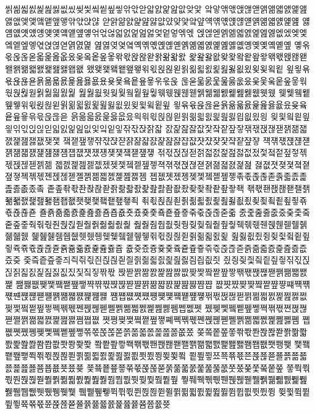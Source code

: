 씱씲씳씴씵씶씷씺씼씾씿앀앁앂앃앆앇앋앏앐앑앒앖앚앛
앜앟앢앣앥앦앧앩앪앫앬앭앮앯앲앶앷앸앹앺앻앾앿얁얂
얃얅얆얈얉얊얋얎얐얒얓얔얖얙얚얛얝얞얟얡얢얣얤얥얦
얧얨얪얫얬얭얮얯얰얱얲얳얶얷얺얿엀엁엂엃엋엍엏엒엓
엕엖엗엙엚엛엜엝엞엟엢엤엦엧엨엩엪엫엯엱엲엳엵엸엹
엺엻옂옃옄옉옊옋옍옎옏옑옒옓옔옕옖옗옚옝옞옟옠옡옢
옣옦옧옩옪옫옯옱옲옶옸옺옼옽옾옿왂왃왅왆왇왉왊왋왌
왍왎왏왒왖왗왘왙왚왛왞왟왡왢왣왤왥왦왧왨왩왪왫왭왮
왰왲왳왴왵왶왷왺왻왽왾왿욁욂욃욄욅욆욇욊욌욎욏욐욑
욒욓욖욗욙욚욛욝욞욟욠욡욢욣욦욨욪욫욬욭욮욯욲욳욵
욶욷욻욼욽욾욿웂웄웆웇웈웉웊웋웎웏웑웒웓웕웖웗웘웙
웚웛웞웟웢웣웤웥웦웧웪웫웭웮웯웱웲웳웴웵웶웷웺웻웼
웾웿윀윁윂윃윆윇윉윊윋윍윎윏윐윑윒윓윖윘윚윛윜윝윞
윟윢윣윥윦윧윩윪윫윬윭윮윯윲윴윶윸윹윺윻윾윿읁읂읃
읅읆읇읈읉읋읎읐읙읚읛읝읞읟읡읢읣읤읥읦읧읩읪읬읭
읮읯읰읱읲읳읶읷읹읺읻읿잀잁잂잆잋잌잍잏잒잓잕잙잛
잜잝잞잟잢잧잨잩잪잫잮잯잱잲잳잵잶잷잸잹잺잻잾쟂쟃
쟄쟅쟆쟇쟊쟋쟍쟏쟑쟒쟓쟔쟕쟖쟗쟙쟚쟛쟜쟞쟟쟠쟡쟢쟣
쟥쟦쟧쟩쟪쟫쟭쟮쟯쟰쟱쟲쟳쟴쟵쟶쟷쟸쟹쟺쟻쟼쟽쟾쟿
젂젃젅젆젇젉젋젌젍젎젏젒젔젗젘젙젚젛젞젟젡젢젣젥젦
젧젨젩젪젫젮젰젲젳젴젵젶젷젹젺젻젽젾젿졁졂졃졄졅졆
졇졊졋졎졏졐졑졒졓졕졖졗졘졙졚졛졜졝졞졟졠졡졢졣졤
졥졦졧졨졩졪졫졬졭졮졯졲졳졵졶졷졹졻졼졽졾졿좂좄좈
좉좊좎좏좐좑좒좓좕좖좗좘좙좚좛좜좞좠좢좣좤좥좦좧좩
좪좫좬좭좮좯좰좱좲좳좴좵좶좷좸좹좺좻좾좿죀죁죂죃죅
죆죇죉죊죋죍죎죏죐죑죒죓죖죘죚죛죜죝죞죟죢죣죥죦죧
죨죩죪죫죬죭죮죯죰죱죲죳죴죶죷죸죹죺죻죾죿줁줂줃줇
줈줉줊줋줎줐줒줓줔줕줖줗줙줚줛줜줝줞줟줠줡줢줣줤줥
줦줧줨줩줪줫줭줮줯줰줱줲줳줵줶줷줸줹줺줻줼줽줾줿쥀
쥁쥂쥃쥄쥅쥆쥇쥈쥉쥊쥋쥌쥍쥎쥏쥒쥓쥕쥖쥗쥙쥚쥛쥜쥝
쥞쥟쥢쥤쥥쥦쥧쥨쥩쥪쥫쥭쥮쥯쥱쥲쥳쥵쥶쥷쥸쥹쥺쥻쥽
쥾쥿즀즁즂즃즄즅즆즇즊즋즍즎즏즑즒즓즔즕즖즗즚즜즞
즟즠즡즢즣즤즥즦즧즨즩즪즫즬즭즮즯즰즱즲즳즴즵즶즷
즸즹즺즻즼즽즾즿짂짃짅짆짉짋짌짍짎짏짒짔짗짘짛짞짟
짡짣짥짦짨짩짪짫짮짲짳짴짵짶짷짺짻짽짾짿쨁쨂쨃쨄쨅
쨆쨇쨊쨎쨏쨐쨑쨒쨓쨕쨖쨗쨙쨚쨛쨜쨝쨞쨟쨠쨡쨢쨣쨤쨥
쨦쨧쨨쨪쨫쨬쨭쨮쨯쨰쨱쨲쨳쨴쨵쨶쨷쨸쨹쨺쨻쨼쨽쨾쨿
쩀쩁쩂쩃쩄쩅쩆쩇쩈쩉쩊쩋쩎쩏쩑쩒쩓쩕쩖쩗쩘쩙쩚쩛쩞
쩢쩣쩤쩥쩦쩧쩩쩪쩫쩬쩭쩮쩯쩰쩱쩲쩳쩴쩵쩶쩷쩸쩹쩺쩻
쩼쩾쩿쪀쪁쪂쪃쪅쪆쪇쪈쪉쪊쪋쪌쪍쪎쪏쪐쪑쪒쪓쪔쪕쪖
쪗쪙쪚쪛쪜쪝쪞쪟쪠쪡쪢쪣쪤쪥쪦쪧쪨쪩쪪쪫쪬쪭쪮쪯쪰
쪱쪲쪳쪴쪵쪶쪷쪸쪹쪺쪻쪾쪿쫁쫂쫃쫅쫆쫇쫈쫉쫊쫋쫎쫐
쫒쫔쫕쫖쫗쫚쫛쫜쫝쫞쫟쫡쫢쫣쫤쫥쫦쫧쫨쫩쫪쫫쫭쫮쫯
쫰쫱쫲쫳쫵쫶쫷쫸쫹쫺쫻쫼쫽쫾쫿쬀쬁쬂쬃쬄쬅쬆쬇쬉쬊
쬋쬌쬍쬎쬏쬑쬒쬓쬕쬖쬗쬙쬚쬛쬜쬝쬞쬟쬢쬣쬤쬥쬦쬧쬨
쬩쬪쬫쬬쬭쬮쬯쬰쬱쬲쬳쬴쬵쬶쬷쬸쬹쬺쬻쬼쬽쬾쬿쭀쭂
쭃쭄쭅쭆쭇쭊쭋쭍쭎쭏쭑쭒쭓쭔쭕쭖쭗쭚쭛쭜쭞쭟쭠쭡쭢
쭣쭥쭦쭧쭨쭩쭪쭫쭬쭭쭮쭯쭰쭱쭲쭳쭴쭵쭶쭷쭺쭻쭼쭽쭾
쭿쮀쮁쮂쮃쮄쮅쮆쮇쮈쮉쮊쮋쮌쮍쮎쮏쮐쮑쮒쮓쮔쮕쮖쮗
쮘쮙쮚쮛쮝쮞쮟쮠쮡쮢쮣쮤쮥쮦쮧쮨쮩쮪쮫쮬쮭쮮쮯쮰쮱
쮲쮳쮴쮵쮶쮷쮹쮺쮻쮼쮽쮾쮿쯀쯁쯂쯃쯄쯅쯆쯇쯈쯉쯊쯋
